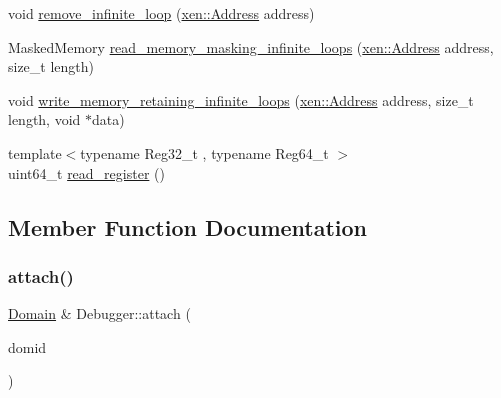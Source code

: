 \begin{DoxyCompactItemize}
\item 
void \mbox{\hyperlink{classxd_1_1dbg_1_1_debugger_abfc9f74ef6e1e147ec853895d0e38f4a}{remove\+\_\+infinite\+\_\+loop}} (\mbox{\hyperlink{namespacexd_1_1xen_a94a8d6c9448e8330c771c100dba152c3}{xen\+::\+Address}} address)
\item 
Masked\+Memory \mbox{\hyperlink{classxd_1_1dbg_1_1_debugger_ab721cea744f771218aac15ee84361fe0}{read\+\_\+memory\+\_\+masking\+\_\+infinite\+\_\+loops}} (\mbox{\hyperlink{namespacexd_1_1xen_a94a8d6c9448e8330c771c100dba152c3}{xen\+::\+Address}} address, size\+\_\+t length)
\item 
void \mbox{\hyperlink{classxd_1_1dbg_1_1_debugger_a6347de6428c0c1489f03a14c89b6fc74}{write\+\_\+memory\+\_\+retaining\+\_\+infinite\+\_\+loops}} (\mbox{\hyperlink{namespacexd_1_1xen_a94a8d6c9448e8330c771c100dba152c3}{xen\+::\+Address}} address, size\+\_\+t length, void $\ast$data)
\item 
{\footnotesize template$<$typename Reg32\+\_\+t , typename Reg64\+\_\+t $>$ }\\uint64\+\_\+t \mbox{\hyperlink{classxd_1_1dbg_1_1_debugger_ad2bfc260b023b17e4da5ca8019319b7b}{read\+\_\+register}} ()
\end{DoxyCompactItemize}


\subsection{Member Function Documentation}
\mbox{\label{classxd_1_1dbg_1_1_debugger_ae398868e872eca4e9b920872c28ded64}} 
\subsubsection{\texorpdfstring{attach()}{attach()}}
{\footnotesize\ttfamily \mbox{\hyperlink{classxd_1_1xen_1_1_domain}{Domain}} \& Debugger\+::attach (\begin{DoxyParamCaption}\item[{\mbox{\hyperlink{namespacexd_1_1xen_aaad6b5eb6f7e5ba76a4e4ca166ac8a08}{xen\+::\+Dom\+ID}}}]{domid }\end{DoxyParamCaption})}

\mbox{\label{classxd_1_1dbg_1_1_debugger_af75fdf2c87819aa19e89c134de6d67ca}} 
